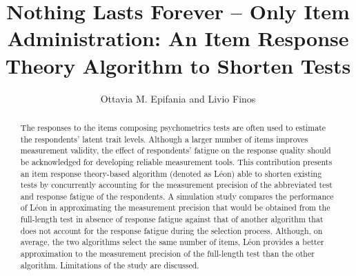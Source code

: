 \documentclass{svproc}
\begin{document}
\mainmatter              %
%
\title{Nothing Lasts Forever -- Only Item Administration: An Item Response Theory Algorithm to Shorten Tests}
%
%
\author{Ottavia M. Epifania and Livio Finos}
%
%
%

\maketitle              %

\begin{abstract} 
The responses to the items composing psychometrics tests are often used to estimate the respondents' latent trait levels.
Although a larger number of items improves measurement validity, the effect of respondents’ fatigue on the response quality should be acknowledged for developing reliable measurement tools.  This contribution presents an item response theory-based algorithm (denoted as Léon) able to shorten existing tests by concurrently accounting for the measurement precision of the abbreviated test and response fatigue of the respondents. A simulation study compares the performance of Léon in approximating the measurement precision that would be obtained from the full-length test in absence of response fatigue against that of another algorithm that does not account for the response fatigue during the selection process. Although, on average, the two algorithms select the same number of items, Léon provides a better approximation to the measurement precision of the full-length test than the other algorithm. Limitations of the study are discussed.
\end{abstract}
%
\end{document}
